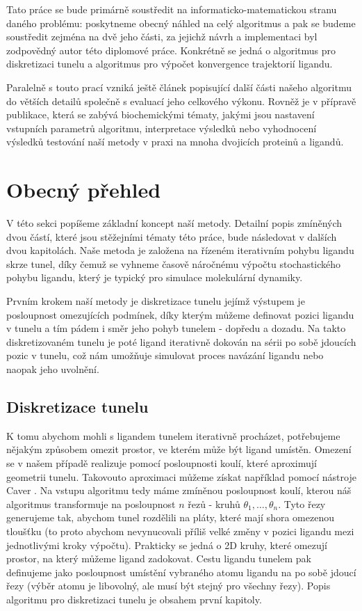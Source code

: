 Tato práce se bude primárně soustředit na informaticko-matematickou stranu
daného problému: poskytneme obecný náhled na celý algoritmus a pak se budeme
soustředit zejména na dvě jeho části, za jejichž návrh a implementaci byl
zodpovědný autor této diplomové práce. Konkrétně se jedná o algoritmus pro
diskretizaci tunelu a algoritmus pro výpočet konvergence trajektorií ligandu. 

Paralelně s touto prací vzniká ještě článek popisující další části našeho algoritmu
do větších detailů společně s evaluací jeho celkového výkonu. Rovněž je v přípravě
publikace, která se zabývá biochemickými tématy, jakými jsou nastavení
vstupních parametrů algoritmu, interpretace výsledků nebo vyhodnocení výsledků
testování naší metody v praxi na mnoha dvojicích proteinů a ligandů.





\section{Obecný přehled}
V této sekci popíšeme základní koncept naší metody. Detailní popis zmíněných
dvou částí, které jsou stěžejními tématy této práce, bude následovat v dalších
dvou kapitolách. Naše metoda je založena na řízeném iterativním pohybu ligandu
skrze tunel, díky čemuž se vyhneme časově náročnému výpočtu stochastického
pohybu ligandu, který je typický pro simulace molekulární dynamiky.

Prvním krokem naší metody je diskretizace tunelu jejímž výstupem je posloupnost
omezujících podmínek, díky kterým můžeme definovat pozici ligandu v tunelu a
tím pádem i směr jeho pohyb tunelem - dopředu a dozadu. Na takto diskretizovaném
tunelu je poté ligand iterativně dokován na sérii po sobě jdoucích pozic v tunelu,
což nám umožňuje simulovat proces navázání ligandu nebo naopak jeho uvolnění.





\subsection{Diskretizace tunelu}
K tomu abychom mohli s ligandem tunelem iterativně procházet, potřebujeme nějakým
způsobem omezit prostor, ve kterém může být ligand umístěn.
Omezení se v našem případě realizuje pomocí posloupnosti koulí, které aproximují
geometrii tunelu. Takovouto aproximaci můžeme získat například pomocí nástroje
Caver \cite{Caver}. Na vstupu algoritmu tedy máme zmíněnou posloupnost
koulí, kterou náš algoritmus transformuje na posloupnost $ n $ řezů - kruhů
$ \theta_1, \dots, \theta_n $. Tyto řezy generujeme tak, abychom tunel rozdělili
na pláty, které mají shora omezenou tloušťku (to proto abychom nevynucovali
příliš velké změny v pozici ligandu mezi jednotlivými kroky výpočtu). Prakticky
se jedná o 2D kruhy, které omezují prostor, na který můžeme ligand zadokovat.
Cestu ligandu tunelem pak definujeme jako posloupnost umístění vybraného atomu
ligandu na po sobě jdoucí řezy (výběr atomu je libovolný, ale musí být stejný
pro všechny řezy). Popis algoritmu pro diskretizaci tunelu je obsahem první kapitoly.

